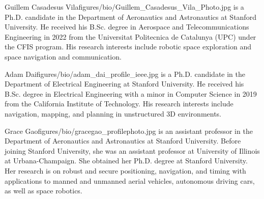 \thebiography

\begin{biographywithpic}
{Guillem Casadesus Vila}{figures/bio/Guillem_Casadesus_Vila_Photo.jpg}
is a Ph.D. candidate in the Department of Aeronautics and Astronautics at Stanford University. He received his B.Sc. degree in Aerospace and Telecommunications Engineering in 2022 from the Universitat Politecnica de Catalunya (UPC) under the CFIS program. His research interests include robotic space exploration and space navigation and communication.
\end{biographywithpic} 

\begin{biographywithpic}
{Adam Dai}{figures/bio/adam_dai_profile_ieee.jpg}
is a Ph.D. candidate in the Department of Electrical Engineering at Stanford University. He received his B.Sc. degree in Electrical Engineering with a minor in Computer Science in 2019 from the California Institute of Technology. His research interests include navigation, mapping, and planning in unstructured 3D environments.
\end{biographywithpic} 

\begin{biographywithpic}
{Grace Gao}{figures/bio/gracegao_profilephoto.jpg}
is an assistant professor in the Department of Aeronautics and Astronautics at Stanford University.
Before joining Stanford University, she was an assistant professor at University of Illinois at Urbana-Champaign.
She obtained her Ph.D. degree at Stanford University.
Her research is on robust and secure positioning, navigation, and timing with applications to manned and unmanned aerial vehicles, autonomous driving cars, as well as space robotics.
\end{biographywithpic}
\vfill